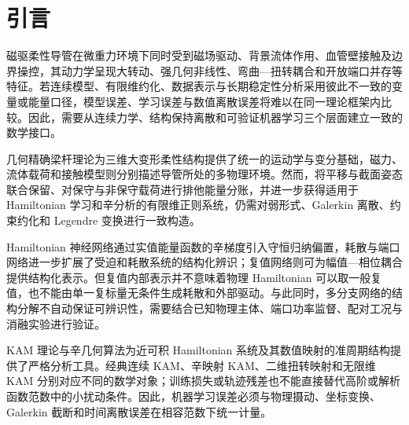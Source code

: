 \section*{引言}
\label{sec:introduction}

磁驱柔性导管在微重力环境下同时受到磁场驱动、背景流体作用、血管壁接触及边界操控，其动力学呈现大转动、强几何非线性、弯曲---扭转耦合和开放端口并存等特征。若连续模型、有限维约化、数据表示与长期稳定性分析采用彼此不一致的变量或能量口径，模型误差、学习误差与数值离散误差将难以在同一理论框架内比较。因此，需要从连续力学、结构保持离散和可验证机器学习三个层面建立一致的数学接口。

几何精确梁杆理论为三维大变形柔性结构提供了统一的运动学与变分基础，磁力、流体载荷和接触模型则分别描述导管所处的多物理环境\cite{Simo1985FiniteStrainBeam,Antman2005Elasticity,Morison1950,COMSOLBeamInterface2025,COMSOLGeometricNonlinearity2025,COMSOLSectionStiffness2025,COMSOLWeakFormPDE2025,COMSOLWeakContribution2025,Sola2018MicroLie,Jackson1998Electrodynamics,Abbott2020MagneticRobotics,Newman1977MarineHydrodynamics,Faltinsen1990SeaLoads,Johnson1985ContactMechanics,HuntCrossley1975Restitution,BrownMcPhee2016Friction,MarsdenRatiu1999MechanicsSymmetry,HairerLubichWanner2006GNI}。然而，将平移与截面姿态联合保留、对保守与非保守载荷进行排他能量分账，并进一步获得适用于 Hamiltonian 学习和辛分析的有限维正则系统，仍需对弱形式、Galerkin 离散、约束约化和 Legendre 变换进行一致构造。

Hamiltonian 神经网络通过实值能量函数的辛梯度引入守恒归纳偏置，耗散与端口网络进一步扩展了受迫和耗散系统的结构化辨识；复值网络则可为幅值---相位耦合提供结构化表示\cite{Greydanus2019HNN,Zhong2020Dissipative,Desai2021PHNN,Chen2022KAMSLT,Trabelsi2018DeepComplex,Hirose2012CVNN}。但复值内部表示并不意味着物理 Hamiltonian 可以取一般复值，也不能由单一复标量无条件生成耗散和外部驱动。与此同时，多分支网络的结构分解不自动保证可辨识性，需要结合已知物理主体、端口功率监督、配对工况与消融实验进行验证。

KAM 理论与辛几何算法为近可积 Hamiltonian 系统及其数值映射的准周期结构提供了严格分析工具\cite{FengQin2010,Shang1999KAMAlgorithms,Shang2000KAMMappings,Haro2016Parameterization,Arnold1989ClassicalMechanics,Coquinot2020Metriplectic,Moser1962InvariantCurves,Kuksin1993InfiniteDimensionalKAM,Poschel2001KAMLecture}。经典连续 KAM、辛映射 KAM、二维扭转映射和无限维 KAM 分别对应不同的数学对象；训练损失或轨迹残差也不能直接替代高阶或解析函数范数中的小扰动条件。因此，机器学习误差必须与物理摄动、坐标变换、Galerkin 截断和时间离散误差在相容范数下统一计量。

